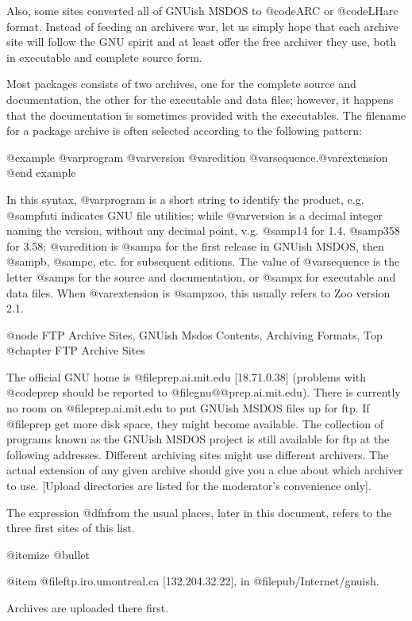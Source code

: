 Also, some sites converted all of GNUish MSDOS to @code{ARC} or
@code{LHarc} format.  Instead of feeding an archivers war, let us simply
hope that each archive site will follow the GNU spirit and at least
offer the free archiver they use, both in executable and complete source
form.

Most packages consists of two archives, one for the complete source
and documentation, the other for the executable and data files;
however, it happens that the documentation is sometimes provided with
the executables.  The filename for a package archive is often selected
according to the following pattern:

@example
@var{program} @var{version} @var{edition} @var{sequence}.@var{extension}
@end example

In this syntax, @var{program} is a short string to identify the product,
e.g. @samp{futi} indicates GNU file utilities; while @var{version} is a
decimal integer naming the version, without any decimal point, v.g.
@samp{14} for 1.4, @samp{358} for 3.58; @var{edition} is @samp{a} for
the first release in GNUish MSDOS, then @samp{b}, @samp{c}, etc.  for
subsequent editions.  The value of @var{sequence} is the letter @samp{s}
for the source and documentation, or @samp{x} for executable and data
files.  When @var{extension} is @samp{zoo}, this usually refers to Zoo
version 2.1.


@node FTP Archive Sites, GNUish Msdos Contents, Archiving Formats, Top
@chapter FTP Archive Sites

The official GNU home is @file{prep.ai.mit.edu} [18.71.0.38] (problems
with @code{prep} should be reported to @file{gnu@@prep.ai.mit.edu}).
There is currently no room on @file{prep.ai.mit.edu} to put GNUish MSDOS
files up for ftp.  If @file{prep} get more disk space, they might become
available.  The collection of programs known as the GNUish MSDOS project
is still available for ftp at the following addresses.  Different
archiving sites might use different archivers.  The actual extension of
any given archive should give you a clue about which archiver to use.
[Upload directories are listed for the moderator's convenience only].

The expression @dfn{from the usual places}, later in this document, refers
to the three first sites of this list.

@itemize @bullet

@item
@file{ftp.iro.umontreal.ca} [132.204.32.22], in @file{pub/Internet/gnuish}.

Archives are uploaded there first.

